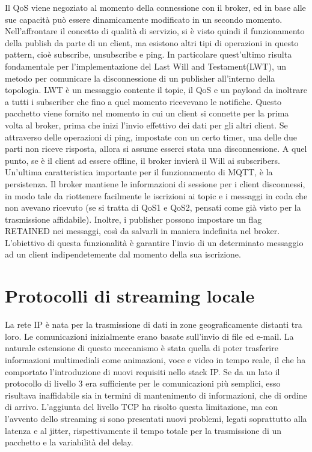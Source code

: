 Il QoS viene negoziato al momento della connessione con il broker, ed in base alle sue capacità può essere dinamicamente modificato in un secondo momento. Nell'affrontare il concetto di qualità di servizio, si è visto quindi il funzionamento della publish da parte di un client, ma esistono altri tipi di operazioni in questo pattern, cioè subscribe, unsubscribe e ping. In particolare quest'ultimo risulta fondamentale per l'implementazione del Last Will and Testament(LWT), un metodo per comunicare la disconnessione di un publisher all'interno della topologia. LWT è un messaggio contente il topic, il QoS e un payload da inoltrare a tutti i subscriber che fino a quel momento ricevevano le notifiche. Questo pacchetto viene fornito nel momento in cui un client si connette per la prima volta al broker, prima che inizi l'invio effettivo dei dati per gli altri client. Se attraverso delle operazioni di ping, impostate con un certo timer, una delle due parti non riceve risposta, allora si assume esserci stata una disconnessione. A quel punto, se è il client ad essere offline, il broker invierà il Will ai subscribers. Un'ultima caratteristica importante per il funzionamento di MQTT, è la persistenza. Il broker mantiene le informazioni di sessione per i client disconnessi, in modo tale da riottenere facilmente le iscrizioni ai topic e i messaggi in coda che non avevano ricevuto (se si tratta di QoS1 e QoS2, pensati come già visto per la trasmissione affidabile). Inoltre, i publisher possono impostare un flag RETAINED nei messaggi, così da salvarli in maniera indefinita nel broker. L'obiettivo di questa funzionalità è garantire l'invio di un determinato messaggio ad un client indipendetemente dal momento della sua iscrizione.  

\section{Protocolli di streaming locale}
La rete IP è nata per la trasmissione di dati in zone geograficamente distanti tra loro. Le comunicazioni inizialmente erano basate sull'invio di file ed e-mail. La naturale estensione di questo meccanismo è stata quella di poter trasferire informazioni multimediali come animazioni, voce e video in tempo reale, il che ha comportato l'introduzione di nuovi requisiti nello stack IP. Se da un lato il protocollo di livello 3 era sufficiente per le comunicazioni più semplici, esso risultava inaffidabile sia in termini di mantenimento di informazioni, che di ordine di arrivo. L'aggiunta del livello TCP ha risolto questa limitazione, ma con l'avvento dello streaming si sono presentati nuovi problemi, legati soprattutto alla latenza e al jitter, rispettivamente il tempo totale per la trasmissione di un pacchetto e la variabilità del delay. 


